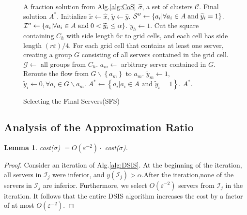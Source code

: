 \documentclass[journal]{IEEEtran}
\newtheorem{lemma}{Lemma}
\begin{document}
\begin{figure}[!t]
	\renewcommand{\algorithmicrequire}{\textbf{Input:}}
	\renewcommand{\algorithmicensure}{\textbf{Output:}}
	\begin{algorithm}[H]
		\caption{Selecting the Final Servers(SFS)}
		\begin{algorithmic}[1]\label{alg:SFS}
			\REQUIRE A fraction solution from Alg.\ref{alg:CoS} $\widehat{\sigma}$, a set of clusters $\mathcal{C}$.
			\ENSURE Final solution $A^*$.
			\STATE Initialize $\widetilde x \leftarrow \widehat x$, $\widetilde y \leftarrow \widehat y$.
			\STATE ${\mathcal{S}''} \leftarrow \left\{ {{a_i}|\forall{a_i} \in A\; {\rm{and}} \; {{\widetilde y}_i} = 1} \right\}$.
			\STATE ${\mathcal{I}''} \leftarrow \left\{ {{a_i}|\forall{a_i} \in A\; {\rm{and}} \; 0<{{\widetilde y}_i} \le \alpha} \right\}$.
			\STATE $\widetilde{y}_h \leftarrow 1$.
			\ELSE
			\STATE Cut the square containing $C_h$ with side length $6r$ to grid cells, and each cell has side length $(r\varepsilon)/4$.
			\STATE For each grid cell that contains at least one server, creating a group $G$ consisting of all servers contained in the grid cell.
			\STATE $\mathcal{G} \leftarrow$ all groups from $C_h$. 
			\STATE $a_m \leftarrow $ arbitrary server contained in $G$.
			\STATE Reroute the flow from $G\backslash \left\{a_m\right\}$ to $a_m$.
			\STATE $\widetilde{y}_m \leftarrow 1$, $\widetilde{y}_i \leftarrow 0, \forall a_i \in G\backslash{a_m}$.
			\ENDFOR
			\ENDIF
			\ENDFOR
			\STATE $A^* \leftarrow \left\{a_i | a_i\in A \text{ and } \widetilde{y}_i = 1 \right\}$.
			\RETURN $A^* $.
		\end{algorithmic}
	\end{algorithm}
\end{figure}

\subsection{Analysis of the Approximation Ratio}

\begin{lemma} \label{lemma:DSIS}
	cost($\overline \sigma$) $= O(\varepsilon^{-2}) \cdot$ cost($\sigma$).
\end{lemma}

\begin{proof}
	Consider an iteration of Alg.\ref{alg:DSIS}. At the beginning of the iteration, all servers in $\mathcal{I}_j$ were inferior, and $y(\mathcal{I}_j) > \alpha$.After the iteration,none of the servers in $\mathcal{I}_j$ are inferior. Furthermore, we select $O(\varepsilon^{-2})$ servers from $\mathcal{I}_j$ in the iteration. It follows that the entire DSIS algorithm increases the cost by a factor of at most $O(\varepsilon^{-2})$.
\end{proof}
\end{document}
